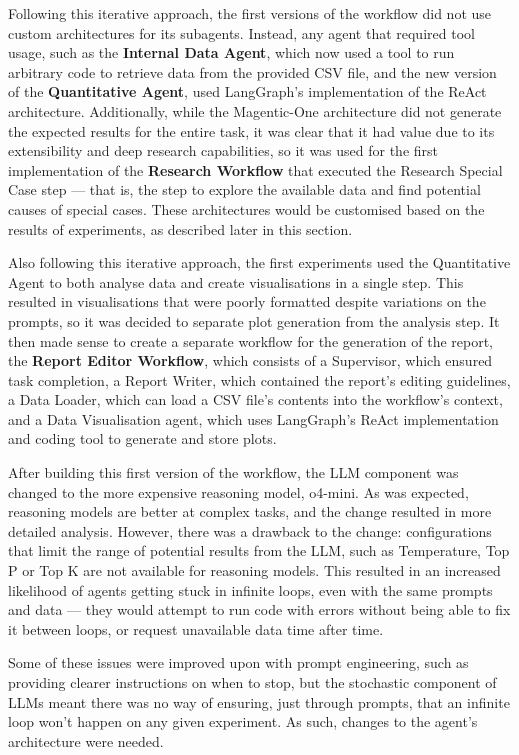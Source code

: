 \documentclass[a4paper]{report}
\begin{document}
Following this iterative approach, the first versions of the workflow did not use custom architectures for its subagents. Instead, any agent that required tool usage, such as the \textbf{Internal Data Agent}, which now used a tool to run arbitrary code to retrieve data from the provided CSV file, and the new version of the \textbf{Quantitative Agent}, used LangGraph's implementation of the ReAct architecture. Additionally, while the Magentic-One architecture did not generate the expected results for the entire task, it was clear that it had value due to its extensibility and deep research capabilities, so it was used for the first implementation of the \textbf{Research Workflow} that executed the Research Special Case step --- that is, the step to explore the available data and find potential causes of special cases. These architectures would be customised based on the results of experiments, as described later in this section.

Also following this iterative approach, the first experiments used the Quantitative Agent to both analyse data and create visualisations in a single step. This resulted in visualisations that were poorly formatted despite variations on the prompts, so it was decided to separate plot generation from the analysis step. It then made sense to create a separate workflow for the generation of the report, the \textbf{Report Editor Workflow}, which consists of a Supervisor, which ensured task completion, a Report Writer, which contained the report's editing guidelines, a Data Loader, which can load a CSV file's contents into the workflow's context, and a Data Visualisation agent, which uses LangGraph's ReAct implementation and coding tool to generate and store plots.

After building this first version of the workflow, the LLM component was changed to the more expensive reasoning model, o4-mini. As was expected, reasoning models are better at complex tasks, and the change resulted in more detailed analysis. However, there was a drawback to the change: configurations that limit the range of potential results from the LLM, such as Temperature, Top P or Top K are not available for reasoning models. This resulted in an increased likelihood of agents getting stuck in infinite loops, even with the same prompts and data --- they would attempt to run code with errors without being able to fix it between loops, or request unavailable data time after time.

Some of these issues were improved upon with prompt engineering, such as providing clearer instructions on when to stop, but the stochastic component of LLMs meant there was no way of ensuring, just through prompts, that an infinite loop won't happen on any given experiment. As such, changes to the agent's architecture were needed.
\end{document}
